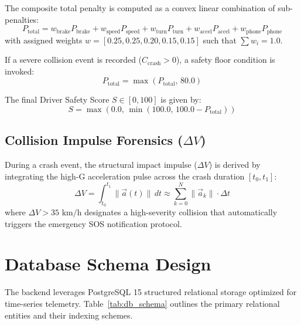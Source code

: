 The composite total penalty is computed as a convex linear combination of sub-penalties:
\begin{equation}
    P_{\text{total}} = w_{\text{brake}} P_{\text{brake}} + w_{\text{speed}} P_{\text{speed}} + w_{\text{turn}} P_{\text{turn}} + w_{\text{accel}} P_{\text{accel}} + w_{\text{phone}} P_{\text{phone}}
\end{equation}
with assigned weights $w = [0.25, 0.25, 0.20, 0.15, 0.15]$ such that $\sum w_i = 1.0$.

If a severe collision event is recorded ($C_{\text{crash}} > 0$), a safety floor condition is invoked:
\begin{equation}
    P_{\text{total}} = \max(P_{\text{total}}, \, 80.0)
\end{equation}

The final Driver Safety Score $S \in [0, 100]$ is given by:
\begin{equation}
    S = \max\left(0.0, \, \min\left(100.0, \, 100.0 - P_{\text{total}}\right)\right)
\end{equation}

\subsection{Collision Impulse Forensics ($\Delta V$)}
During a crash event, the structural impact impulse ($\Delta V$) is derived by integrating the high-G acceleration pulse across the crash duration $[t_0, t_1]$:
\begin{equation}
    \Delta V = \int_{t_0}^{t_1} \|\vec{a}(t)\| \, dt \approx \sum_{k=0}^{N} \|\vec{a}_k\| \cdot \Delta t
\end{equation}
where $\Delta V > 35\text{ km/h}$ designates a high-severity collision that automatically triggers the emergency SOS notification protocol.

\section{Database Schema Design}
\label{sec:db_schema}
The backend leverages PostgreSQL 15 structured relational storage optimized for time-series telemetry. Table~\ref{tab:db_schema} outlines the primary relational entities and their indexing schemes.

